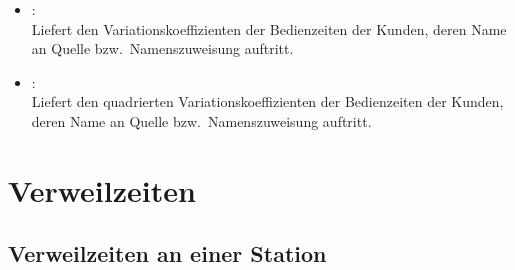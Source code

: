 \begin{itemize}
\item
{}:\\
Liefert den Variationskoeffizienten der Bedienzeiten der Kunden, deren Name an Quelle bzw.\ Namenszuweisung  auftritt.

\item
{}:\\
Liefert den quadrierten Variationskoeffizienten der Bedienzeiten der Kunden, deren Name an Quelle bzw.\ Namenszuweisung  auftritt.

\end{itemize}



\section{Verweilzeiten}



\subsection{Verweilzeiten an einer Station}

